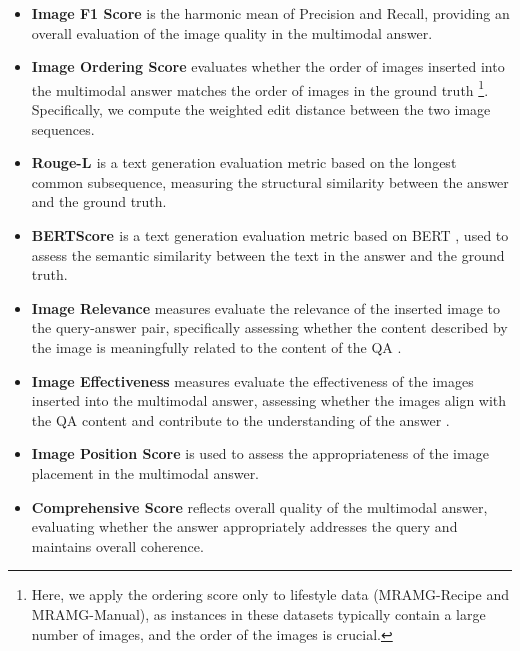 \begin{itemize}
    \item 
    \textbf{Image F1 Score} is the harmonic mean of Precision and Recall, providing an overall evaluation of the image quality in the multimodal answer. 
    \item 
    \textbf{Image Ordering Score} evaluates whether the order of images inserted into the multimodal answer matches the order of images in the ground truth \footnote{Here, we apply the ordering score only to lifestyle data (MRAMG-Recipe and MRAMG-Manual), as instances in these datasets typically contain a large number of images, and the order of the images is crucial.}. Specifically, we compute the weighted edit distance between the two image sequences. %
    \item 
    \textbf{Rouge-L \citep{lin-2004-rouge}} is a text generation evaluation metric based on the longest common subsequence, measuring the structural similarity between the answer and the ground truth.
    \item 
    \textbf{BERTScore \citep{zhang2019bertscore}} is a text generation evaluation metric based on BERT \citep{devlin2018bert}, used to assess the semantic similarity between the text in the answer and the ground truth.
    \item 
    \textbf{Image Relevance} measures evaluate the relevance of the inserted image to the query-answer pair, specifically assessing whether the content described by the image is meaningfully related to the content of the QA \citep{zhu2024murar,ma2024multi}. %
    \item 
    \textbf{Image Effectiveness} measures evaluate the effectiveness of the images inserted into the multimodal answer, assessing whether the images align with the QA content and contribute to the understanding of the answer \citep{zhu2024murar,ma2024multi}. 
    \item 
    \textbf{Image Position Score} is used to assess the appropriateness of the image placement in the multimodal answer. 
    \item 
    \textbf{Comprehensive Score} reflects overall quality of the multimodal answer, evaluating whether the answer appropriately addresses the query and maintains overall coherence. %
\end{itemize}
\vspace{-5pt}
